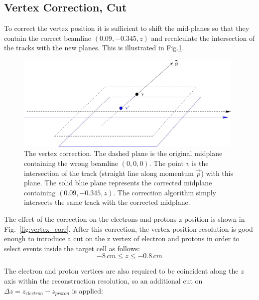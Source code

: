 \clearpage\newpage

\subsection{Vertex Correction, Cut}\label{subsec:vertex-correction-cut}
To correct the vertex position it is sufficient to shift the mid-planes
so that they contain the correct beamline $(0.09, -0.345, z)$ and recalculate
the intersection of the tracks with the new planes.
This is illustrated in Fig.\ref{fig:vertex}.

\begin{figure}[h]
    \centering
    \includegraphics[width=0.98\textwidth ]{img/corr_vertex}
    \caption{The vertex correction. The dashed plane is the original midplane
    containing the wrong beamline $(0, 0, 0)$. The point $v$ is the
    intersection of the track (straight line along momentum $\vec p$)
        with this plane. The solid blue plane represents the corrected
        midplane containing $(0.09, -0.345, z)$. The correction algorithm
        simply intersects the same track with the corrected midplane. }
    \label{fig:vertex}
\end{figure}


\vspace{1cm}
The effect of the correction on the electrons and protons z position
is shown in Fig.~\ref{fig:vertex_corr}.
After this correction, the vertex position resolution is good enough to
introduce a cut on the z vertex of electron and protons in order to
select events inside the target cell as follows:
\begin{equation}
    -8\, cm \le z \le -0.8\, cm
    \label{eq:vertex_cut1}
\end{equation}

The electron and proton vertices are also required to be coincident along the $z$ axis
within the reconstruction resolution, so an additional cut on
$\Delta z = z_{electron} - z_{proton}$ is applied:

